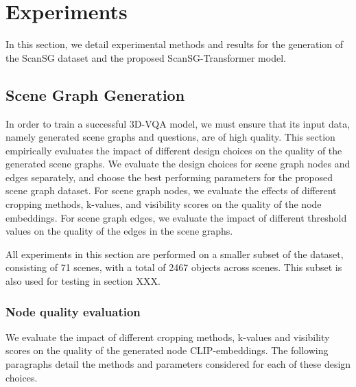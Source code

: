 %
\newpage
\chapter{Experiments}

In this section, we detail experimental methods and results for the generation of the ScanSG dataset and the proposed ScanSG-Transformer model.

\section{Scene Graph Generation}

In order to train a successful 3D-VQA model, we must ensure that its input data, namely generated scene graphs and questions, are of high quality. This section empirically evaluates the impact of different design choices on the quality of the generated scene graphs. We evaluate the design choices for scene graph nodes and edges separately, and choose the best performing parameters for the proposed scene graph dataset. For scene graph nodes, we evaluate the effects of different cropping methods, k-values, and visibility scores on the quality of the node embeddings. For scene graph edges, we evaluate the impact of different threshold values on the quality of the edges in the scene graphs.

All experiments in this section are performed on a smaller subset of the dataset, consisting of 71 scenes, with a total of 2467 objects across scenes. This subset is also used for testing in section XXX.

\subsection{Node quality evaluation}
We evaluate the impact of different cropping methods, k-values and visibility scores on the quality of the generated node CLIP-embeddings. The following paragraphs detail the methods and parameters considered for each of these design choices.

